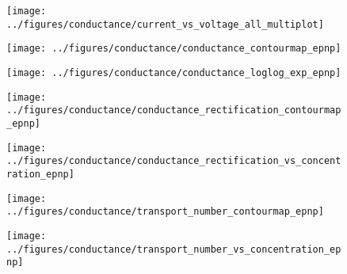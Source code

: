 \begin{figure*}[!htb]
  \centering
  \begin{minipage}[h]{15cm}
  \begin{minipage}[h]{5cm}
    \begin{subfigure}[t]{4.5cm}
      \centering
      \caption{}\vspace{-3mm}\label{fig:current-voltage_curves}
      \texttt{[image: ../figures/conductance/current\_vs\_voltage\_all\_multiplot]}
    \end{subfigure}
  \end{minipage}
  \begin{minipage}[h]{8cm}
    \begin{subfigure}[t]{4cm}
      \centering
      \caption{}\vspace{-5mm}\label{fig:conductance_contourmap_epnp}
      \texttt{[image: ../figures/conductance/conductance\_contourmap\_epnp]}
    \end{subfigure}
    \hspace{-1cm}
    \begin{subfigure}[t]{4cm}
      \centering
      \caption{}\vspace{-5mm}\label{fig:conductance_loglog_exp_epnp}
      \texttt{[image: ../figures/conductance/conductance\_loglog\_exp\_epnp]}
    \end{subfigure}
    \begin{subfigure}[h]{4cm}
      \vspace{3mm}
      \centering
      \caption{}\vspace{-5mm}\label{fig:conductance_rectification_contourmap_epnp}
      \texttt{[image: ../figures/conductance/conductance\_rectification\_contourmap\_epnp]}
    \end{subfigure}
    \hspace{-1cm}
    \begin{subfigure}[t]{4cm}
      \centering
      \caption{}\vspace{-5mm}\label{fig:conductance_rectification_vs_concentration_epnp}
      \texttt{[image: ../figures/conductance/conductance\_rectification\_vs\_concentration\_epnp]}
    \end{subfigure}
    \begin{subfigure}[h]{4cm}
      \vspace{3mm}
      \centering
      \caption{}\vspace{-5mm}\label{fig:transport_number_contourmap_epnp}
      \texttt{[image: ../figures/conductance/transport\_number\_contourmap\_epnp]}
    \end{subfigure}
    \hspace{-1cm}
    \begin{subfigure}[t]{4cm}
      \centering
      \caption{}\vspace{-5mm}\label{fig:transport_number_vs_concentration_epnp}
      \texttt{[image: ../figures/conductance/transport\_number\_vs\_concentration\_epnp]}
    \end{subfigure}
  \end{minipage}
\end{minipage}


\end{figure*}
